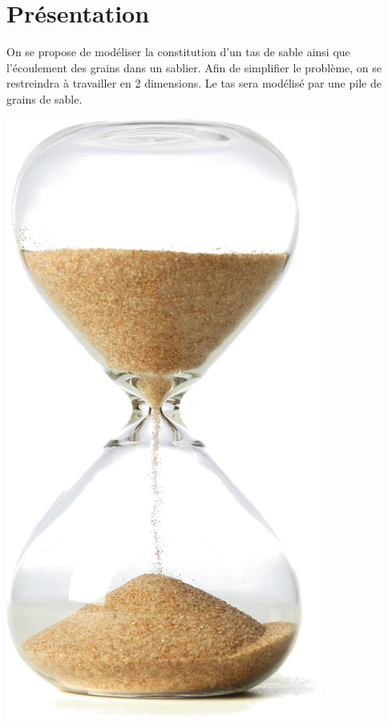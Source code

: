 \documentclass[10pt,fleqn]{article} %
\begin{document}

\vspace{2cm}
\pagestyle{fancy}
\thispagestyle{plain}

\section{Présentation}

\begin{minipage}[c]{.88\linewidth}
On se propose de modéliser la constitution d'un tas de sable ainsi que l'écoulement des grains dans un sablier. Afin de simplifier le problème, on se restreindra à travailler en 2 dimensions. Le tas sera modélisé par une pile de grains de sable. 
\end{minipage} \hfill
\begin{minipage}[c]{.05\linewidth}
\begin{center}
\includegraphics[width=\linewidth]{images/sablier_p}
\end{center}
\end{minipage}
\end{document}
